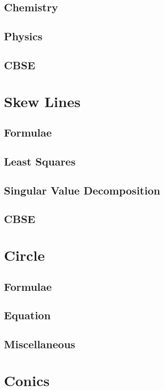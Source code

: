 \documentclass[journal]{IEEEtran}
\begin{document}
\subsection{Chemistry}

\subsection{Physics}

\subsection{CBSE}

\newpage
\section{Skew Lines}
\subsection{Formulae}

\subsection{Least Squares}

\subsection{Singular Value Decomposition}

\subsection{CBSE}

\newpage
\section{Circle}
\subsection{Formulae}

\subsection{Equation}

\subsection{Miscellaneous}

\newpage
\section{Conics}
\end{document}
